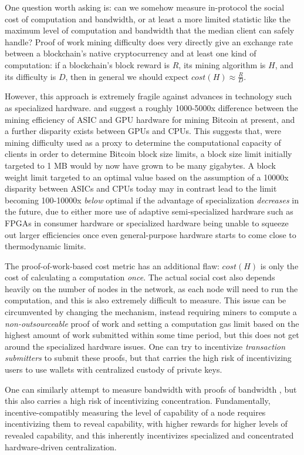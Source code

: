 \documentclass[12pt, final]{article}
\begin{document}
One question worth asking is: can we somehow measure in-protocol the social cost of computation and bandwidth, or at least a more limited statistic like the maximum level of computation and bandwidth that the median client can safely handle? Proof of work mining difficulty does very directly give an exchange rate between a blockchain's native cryptocurrency and at least one kind of computation: if a blockchain's block reward is $R$, its mining algorithm is $H$, and its difficulty is $D$, then in general we should expect $cost(H) \approx \frac{R}{D}$.

However, this approach is extremely fragile against advances in technology such as specialized hardware. \cite{hardware1} and \cite{hardware2} suggest a roughly 1000-5000x difference between the mining efficiency of ASIC and GPU hardware for mining Bitcoin at present, and a further disparity exists between GPUs and CPUs. This suggests that, were mining difficulty used as a proxy to determine the computational capacity of clients in order to determine Bitcoin block size limits, a block size limit initially targeted to 1 MB would by now have grown to be many gigabytes. A block weight limit targeted to an optimal value based on the assumption of a 10000x disparity between ASICs and CPUs today may in contrast lead to the limit becoming 100-10000x \emph{below} optimal if the advantage of specialization \emph{decreases} in the future, due to either more use of adaptive semi-specialized hardware such as FPGAs in consumer hardware or specialized hardware being unable to squeeze out larger efficiencies once even general-purpose hardware starts to come close to thermodynamic limits.

The proof-of-work-based cost metric has an additional flaw: $cost(H)$ is only the cost of calculating a computation \emph{once}. The actual social cost also depends heavily on the number of nodes in the network, as each node will need to run the computation, and this is also extremely difficult to measure. This issue can be circumvented by changing the mechanism, instead requiring miners to compute a \emph{non-outsourceable} proof of work \cite{nonoutsourceable} and setting a computation gas limit based on the highest amount of work submitted within some time period, but this does not get around the specialized hardware issues. One can try to incentivize \emph{transaction submitters} to submit these proofs, but that carries the high risk of incentivizing users to use wallets with centralized custody of private keys.

One can similarly attempt to measure bandwidth with proofs of bandwidth \cite{proof-of-bandwidth}, but this also carries a high risk of incentivizing concentration. Fundamentally, incentive-compatibly measuring the level of capability of a node requires incentivizing them to reveal capability, with higher rewards for higher levels of revealed capability, and this inherently incentivizes specialized and concentrated hardware-driven centralization.
\end{document}
